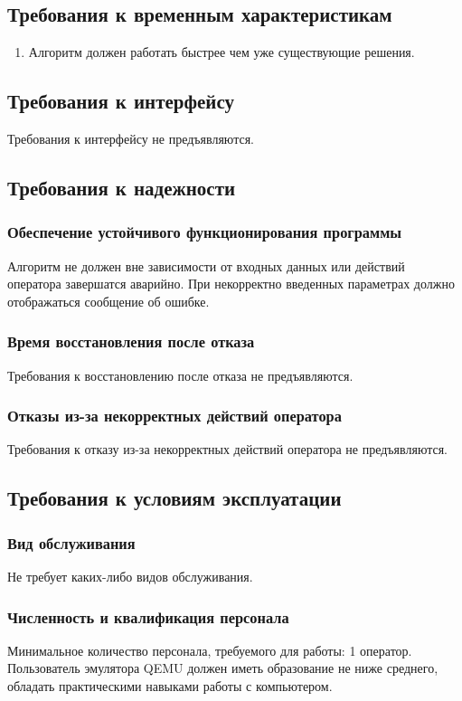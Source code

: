 \subsection{Требования к временным характеристикам}
\begin{enumerate}
\item Алгоритм должен работать быстрее чем уже существующие решения.
\end{enumerate}


\subsection{Требования к интерфейсу}
Требования к интерфейсу не предъявляются.

\subsection{Требования к надежности}
\subsubsection{Обеспечение устойчивого функционирования программы}
Алгоритм не должен вне зависимости от входных данных или действий оператора завершатся аварийно. При некорректно введенных параметрах должно отображаться сообщение об ошибке.
\subsubsection{Время восстановления после отказа}
Требования к восстановлению после отказа не предъявляются.
\subsubsection{Отказы из-за некорректных действий оператора}
Требования к отказу из-за некорректных действий оператора не предъявляются.

\subsection{Требования к условиям эксплуатации}
\subsubsection{Вид обслуживания}
Не требует каких-либо видов обслуживания.
\subsubsection{Численность и квалификация персонала}
Минимальное количество персонала, требуемого для работы: 1 оператор. Пользователь эмулятора QEMU должен иметь образование не ниже среднего, обладать практическими навыками работы с компьютером.


